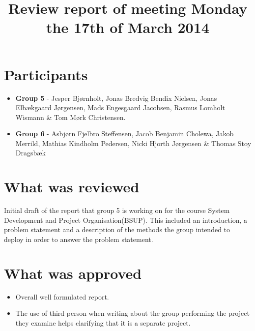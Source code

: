 \documentclass[]{article}
\title{Review report of meeting Monday the 17th of March 2014}
\begin{document}
\maketitle


\section*{Participants}
\begin{itemize}
\item \textbf{Group 5} - Jesper Bj\o rnholt, Jonas Bredvig Bendix Nielsen, Jonas Elb\ae kgaard J\o rgensen, Mads Engesgaard Jacobsen, Rasmus Lomholt Wismann \& Tom M\o rk Christensen.
\item \textbf{Group 6} - Asbj\o rn Fjelbro Steffensen, Jacob Benjamin Cholewa, Jakob Merrild, Mathias Kindholm Pedersen, Nicki Hjorth J\o rgensen \& Thomas Stoy Dragsb\ae k
\end{itemize}
\section*{What was reviewed}
Initial draft of the report that group 5 is working on for the course System Development and Project Organisation(BSUP). This included an introduction, a problem statement and a description of the methods the group intended to deploy in order to answer the problem statement.
\section*{What was approved}
\begin{itemize}
\item Overall well formulated report.
\item The use of third person when writing about the group performing the project they examine helps clarifying that it is a separate project.
\end{itemize}
\end{document}
